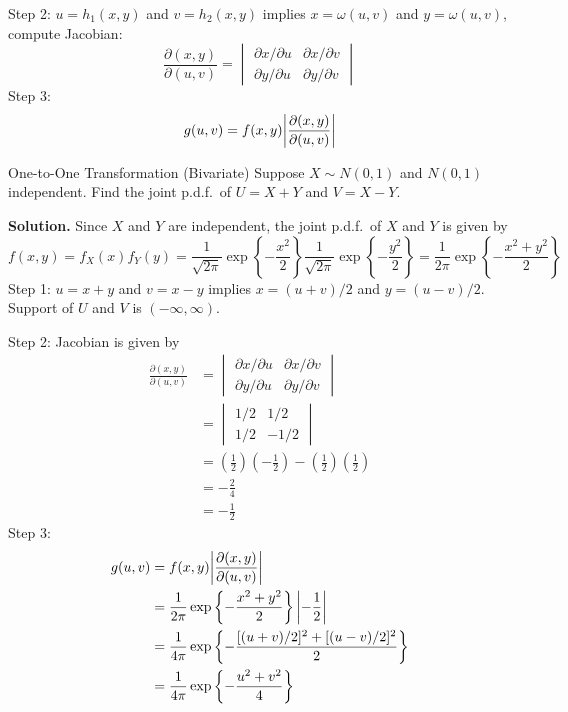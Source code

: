 Step 2: $ u=h_1(x,y) $ and $ v=h_2(x,y) $ implies
$ x=\omega(u,v) $ and $ y=\omega(u,v) $, compute Jacobian:
\[ \frac{\partial(x,y)}{\partial(u,v)}=\begin{vmatrix}
        \partial x/\partial u & \partial x/\partial v \\
        \partial y/\partial u & \partial y/\partial v
    \end{vmatrix} \]
Step 3:
\[ g(u,v)=f(x,y)\abs*{\frac{\partial(x,y)}{\partial(u,v)} } \]
\begin{Example}{One-to-One Transformation (Bivariate)}{}
    Suppose $ X \sim N(0,1) $ and $ N(0,1) $ independent.
    Find the joint p.d.f.\ of $ U=X+Y $ and $ V=X-Y $.

    \textbf{Solution.} Since $ X $ and $ Y $ are independent,
    the joint p.d.f.\ of $ X $ and $ Y $ is given by
    \[ f(x,y)=f_X(x)f_Y(y)=\frac{1}{\sqrt{2\pi}}\exp\left\{ -\frac{x^2}{2}\right\}
        \frac{1}{\sqrt{2\pi}}\exp\left\{ -\frac{y^2}{2}\right\}=
        \frac{1}{2\pi}\exp\left\{ -\frac{x^2+y^2}{2} \right\}  \]
    Step 1: $ u=x+y $ and $ v=x-y $ implies $ x=(u+v)/2 $
    and $ y=(u-v)/2 $. Support of $ U $ and $ V $ is $ (-\infty,\infty) $.

    Step 2: Jacobian is given by
    \begin{align*}
        \frac{\partial(x,y)}{\partial(u,v)}
         & =\begin{vmatrix}
            \partial x/\partial u & \partial x/\partial v \\
            \partial y/\partial u & \partial y/\partial v
        \end{vmatrix}                             \\
         & =\begin{vmatrix}
            1/2 & 1/2  \\
            1/2 & -1/2
        \end{vmatrix}                             \\
         & =\left( \frac{1}{2} \right)\left( -\frac{1}{2} \right)
        -\left( \frac{1}{2} \right)\left( \frac{1}{2} \right)     \\
         & =-\frac{2}{4}                                          \\
         & =-\frac{1}{2}
    \end{align*}
    Step 3:
    \begin{align*}
        g(u,v)
         & =f(x,y)\abs*{\frac{\partial(x,y)}{\partial(u,v)}}                        \\
         & =\frac{1}{2\pi}\exp\left\{ -\frac{x^2+y^2}{2}\right\}\abs*{-\frac{1}{2}} \\
         & =\frac{1}{4\pi}\exp\left\{ -\frac{[(u+v)/2]^2+[(u-v)/2]^2}{2} \right\}   \\
         & =\frac{1}{4\pi}\exp\left\{ -\frac{u^2+v^2}{4} \right\}
    \end{align*}
\end{Example}
